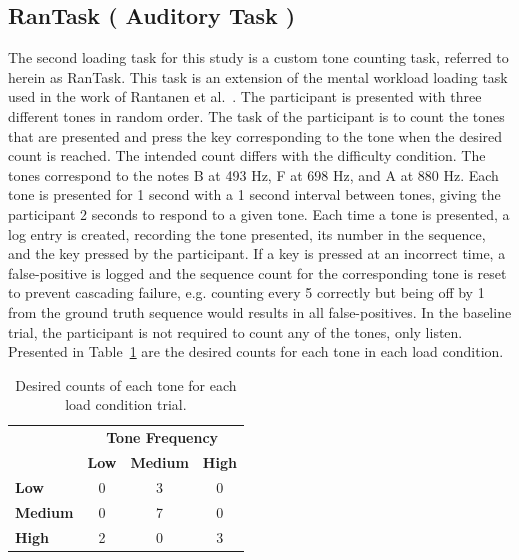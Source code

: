\documentclass[11pt]{article}
\begin{document}
\subsection{RanTask ( Auditory Task )}
The second loading task for this study is a custom tone counting task, referred to herein as RanTask. This task is an extension of the mental workload loading task used in the work of Rantanen et al.~\cite{Rantanen}. The participant is presented with three different tones in random order. The task of the participant is to count the tones that are presented and press the key corresponding to the tone when the desired count is reached.  The intended count differs with the difficulty condition. The tones correspond to the notes B at 493 Hz, F at 698 Hz, and A at 880 Hz. Each tone is presented for 1 second with a 1 second interval between tones, giving the participant 2 seconds to respond to a given tone. Each time a tone is presented, a log entry is created, recording the tone presented, its number in the sequence, and the key pressed by the participant. If a key is pressed at an incorrect time, a false-positive is logged and the sequence count for the corresponding tone is reset to prevent cascading failure, e.g. counting every 5 correctly but being off by 1 from the ground truth sequence would results in all false-positives. In the baseline trial, the participant is not required to count any of the tones, only listen. Presented in Table~\ref{tab:ran} are the desired counts for each tone in each load condition.

\begin{table}[h]
\centering
\begin{tabular}{l|ccc}
                                                                     & \multicolumn{3}{c}{\textbf{Tone Frequency}}                                     \\
\rowcolor[HTML]{FFFFFF} 
\multicolumn{1}{c|}{\cellcolor[HTML]{FFFFFF}\textbf{Load Condition}} & \textbf{Low} & \textbf{Medium} & \textbf{High}                                   \\ \hline
\rowcolor[HTML]{FFFFFF} 
\textbf{Low}                                                         & 0          & 3               & \multicolumn{1}{c|}{\cellcolor[HTML]{FFFFFF}0}  \\
\rowcolor[HTML]{EFEFEF} 
\textbf{Medium}                                                      & 0       & 7              & \multicolumn{1}{c|}{\cellcolor[HTML]{EFEFEF}0} \\
\rowcolor[HTML]{FFFFFF} 
\textbf{High}                                                        & 2         & 0              & \multicolumn{1}{c|}{\cellcolor[HTML]{FFFFFF}3} \\ \cline{2-4} 
\end{tabular}
  \caption{Desired counts of each tone for each load condition trial.}
  \label{tab:ran}
\end{table}
\end{document}
